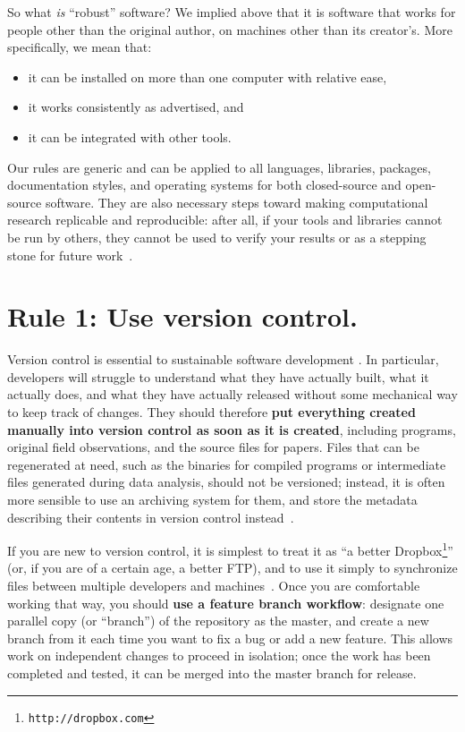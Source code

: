 \documentclass[10pt,letterpaper]{article}
\newcommand{\withurl}[2]{{#1}\footnote{\texttt{#2}}}
\newcommand{\rulemajor}[1]{\section{#1}}
\newcommand{\ruleminor}[1]{\textbf{#1}}
\begin{document}
So what \emph{is} ``robust'' software?  We implied above that it is
software that works for people other than the original author, on
machines other than its creator's.  More specifically, we mean that:

\begin{itemize}

\item
  it can be installed on more than one computer with relative ease,

\item
  it works consistently as advertised, and

\item
  it can be integrated with other tools.

\end{itemize}

Our rules are generic and can be applied to all languages, libraries,
packages, documentation styles, and operating systems for both
closed-source and open-source software.  They are also necessary steps
toward making computational research replicable and reproducible:
after all, if your tools and libraries cannot be run by others, they
cannot be used to verify your results or as a stepping stone for
future work~\cite{brown2013}.

\rulemajor{Rule 1: Use version control.}

Version control is essential to sustainable software development
\cite{wilson2014,wilson2016}.  In particular, developers will struggle
to understand what they have actually built, what it actually does,
and what they have actually released without some mechanical way to
keep track of changes.  They should therefore \ruleminor{put
everything created manually into version control as soon as it is
created}, including programs, original field observations, and the
source files for papers.  Files that can be regenerated at need, such
as the binaries for compiled programs or intermediate files generated
during data analysis, should not be versioned; instead, it is often
more sensible to use an archiving system for them, and store the
metadata describing their contents in version control
instead~\cite{noble2009}.

If you are new to version control, it is simplest to treat it as ``a
better \withurl{Dropbox}{http://dropbox.com}'' (or, if you are of a
certain age, a better FTP), and to use it simply to synchronize files
between multiple developers and machines~\cite{blischak2016}.  Once
you are comfortable working that way, you should \ruleminor{use a
feature branch workflow}: designate one parallel copy (or
``branch'') of the repository as the master, and create a new branch
from it each time you want to fix a bug or add a new feature.  This
allows work on independent changes to proceed in isolation; once the
work has been completed and tested, it can be merged into the master
branch for release.
\end{document}
